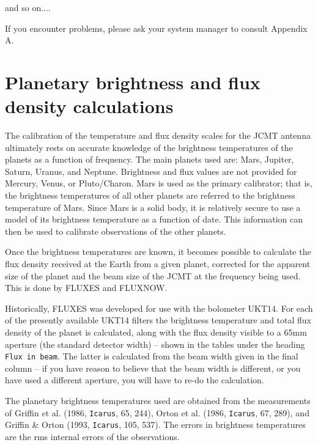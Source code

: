 \documentclass[11pt,twoside]{article}
\newcommand{\htmladdnormallink}[2]{#1}
\newcommand{\xlabel}[1]{}
\renewcommand{\_}{\texttt{\symbol{95}}}
\begin{document}
and so on....

If you encounter problems, please ask your system manager to consult
Appendix A.

\section{Planetary brightness and flux density calculations}
\xlabel{PLANET}
\label{sec:planet}

The calibration of the temperature and flux density scales for the
\htmladdnormallink{JCMT}{http://www.jach.hawaii.edu/JCMT/home.html} antenna
ultimately rests on accurate knowledge of the brightness temperatures of the
planets as a function of frequency.
The main planets used are: Mars, Jupiter, Saturn, Uranus, and Neptune.
Brightness and flux values are not provided for Mercury, Venus, or Pluto/Charon.
Mars is used as the primary calibrator; that is, the brightness
temperatures of all other planets are referred to the brightness temperature of
Mars. Since Mars is a solid body, it is relatively secure to use a model of its
brightness temperature as a function of date. This information can then be used
to calibrate observations of the other planets.

Once the brightness temperatures are known, it becomes possible to calculate
the flux density received at the Earth from a given planet, corrected for the
apparent size of the planet and the beam size of the
\htmladdnormallink{JCMT}{http://www.jach.hawaii.edu/JCMT/home.html}
at the frequency being used.
This is done by FLUXES and FLUXNOW.

Historically, FLUXES was developed for use with the bolometer UKT14.
For each of the presently available UKT14 filters the brightness temperature
and total flux density of the planet is calculated, along with the flux density
visible to a 65mm aperture (the standard detector width) -- shown in the
tables under the heading {\tt{Flux in beam}}.
The latter is calculated from the beam width given in the final column -- if
you have reason to believe that the beam width is different, or you have used a
different aperture, you will have to re-do the calculation.

The planetary brightness temperatures used are obtained from the measurements
of Griffin et al. (1986, {\tt{Icarus}}, 65, 244), Orton et al.
(1986, {\tt{Icarus}}, 67, 289),
and Griffin \& Orton (1993, {\tt{Icarus}}, 105, 537). The errors in brightness
temperatures are the rms internal errors of the observations.
\end{document}
